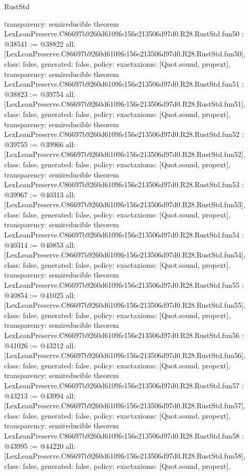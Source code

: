 \begin{lexlean}{RustStd}
\begin{coremodule}
{  transparency: semireducible
}
theorem LexLeanPreserve.C86697b9260d6109fe156e213506d97d0.R28.RustStd.fun50 : @38541 := @38822 {
  all: [LexLeanPreserve.C86697b9260d6109fe156e213506d97d0.R28.RustStd.fun50],
  class: false,
  generated: false,
  policy: exact{axioms: [Quot.sound, propext]},
  transparency: semireducible
}
theorem LexLeanPreserve.C86697b9260d6109fe156e213506d97d0.R28.RustStd.fun51 : @38823 := @39754 {
  all: [LexLeanPreserve.C86697b9260d6109fe156e213506d97d0.R28.RustStd.fun51],
  class: false,
  generated: false,
  policy: exact{axioms: [Quot.sound, propext]},
  transparency: semireducible
}
theorem LexLeanPreserve.C86697b9260d6109fe156e213506d97d0.R28.RustStd.fun52 : @39755 := @39966 {
  all: [LexLeanPreserve.C86697b9260d6109fe156e213506d97d0.R28.RustStd.fun52],
  class: false,
  generated: false,
  policy: exact{axioms: [Quot.sound, propext]},
  transparency: semireducible
}
theorem LexLeanPreserve.C86697b9260d6109fe156e213506d97d0.R28.RustStd.fun53 : @39967 := @40313 {
  all: [LexLeanPreserve.C86697b9260d6109fe156e213506d97d0.R28.RustStd.fun53],
  class: false,
  generated: false,
  policy: exact{axioms: [Quot.sound, propext]},
  transparency: semireducible
}
theorem LexLeanPreserve.C86697b9260d6109fe156e213506d97d0.R28.RustStd.fun54 : @40314 := @40853 {
  all: [LexLeanPreserve.C86697b9260d6109fe156e213506d97d0.R28.RustStd.fun54],
  class: false,
  generated: false,
  policy: exact{axioms: [Quot.sound, propext]},
  transparency: semireducible
}
theorem LexLeanPreserve.C86697b9260d6109fe156e213506d97d0.R28.RustStd.fun55 : @40854 := @41025 {
  all: [LexLeanPreserve.C86697b9260d6109fe156e213506d97d0.R28.RustStd.fun55],
  class: false,
  generated: false,
  policy: exact{axioms: [Quot.sound, propext]},
  transparency: semireducible
}
theorem LexLeanPreserve.C86697b9260d6109fe156e213506d97d0.R28.RustStd.fun56 : @41026 := @43212 {
  all: [LexLeanPreserve.C86697b9260d6109fe156e213506d97d0.R28.RustStd.fun56],
  class: false,
  generated: false,
  policy: exact{axioms: [Quot.sound, propext]},
  transparency: semireducible
}
theorem LexLeanPreserve.C86697b9260d6109fe156e213506d97d0.R28.RustStd.fun57 : @43213 := @43994 {
  all: [LexLeanPreserve.C86697b9260d6109fe156e213506d97d0.R28.RustStd.fun57],
  class: false,
  generated: false,
  policy: exact{axioms: [Quot.sound, propext]},
  transparency: semireducible
}
theorem LexLeanPreserve.C86697b9260d6109fe156e213506d97d0.R28.RustStd.fun58 : @43995 := @44220 {
  all: [LexLeanPreserve.C86697b9260d6109fe156e213506d97d0.R28.RustStd.fun58],
  class: false,
  generated: false,
  policy: exact{axioms: [Quot.sound, propext]},
}
\end{coremodule}
\end{lexlean}
